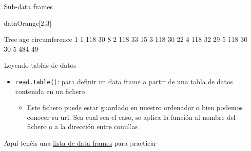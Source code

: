 \documentclass[
  ignorenonframetext,
  aspectratio=169]{beamer}
\newenvironment{Shaded}{\begin{snugshade}}{\end{snugshade}}
\newcommand{\DecValTok}[1]{\textcolor[rgb]{0.00,0.00,0.81}{#1}}
\newcommand{\NormalTok}[1]{#1}
\newcommand{\SpecialCharTok}[1]{\textcolor[rgb]{0.00,0.00,0.00}{#1}}
\providecommand{\tightlist}{%
  \setlength{\itemsep}{0pt}\setlength{\parskip}{0pt}}
\let\oldverbatim\verbatim
\let\endoldverbatim\endverbatim
\renewenvironment{verbatim}{\tiny\oldverbatim}{\endoldverbatim}
\begin{document}
\begin{frame}[fragile]{Sub-data frames}
\protect\hypertarget{sub-data-frames-2}{}
\begin{Shaded}
\begin{Highlighting}[]
\NormalTok{dataOrange[}\DecValTok{2}\NormalTok{,}\DecValTok{3}\NormalTok{]}
\end{Highlighting}
\end{Shaded}

\begin{verbatim}
[1] 58
\end{verbatim}

\begin{Shaded}
\end{Shaded}

\begin{verbatim}
   Tree age circumference
1     1 118            30
8     2 118            33
15    3 118            30
22    4 118            32
29    5 118            30
30    5 484            49
\end{verbatim}
\end{frame}

\begin{frame}[fragile]{Leyendo tablas de datos}
\protect\hypertarget{leyendo-tablas-de-datos}{}
\begin{itemize}
\tightlist
\item
  \texttt{read.table()}: para definir un data frame a partir de una
  tabla de datos contenida en un fichero

  \begin{itemize}
  \tightlist
  \item
    Este fichero puede estar guardado en nuestro ordenador o bien
    podemos conocer su url. Sea cual sea el caso, se aplica la función
    al nombre del fichero o a la dirección entre comillas
  \end{itemize}
\end{itemize}

Aquí tenéis una \href{http://aprender.uib.es/}{lista de data frames}
para practicar
\end{frame}
\end{document}
